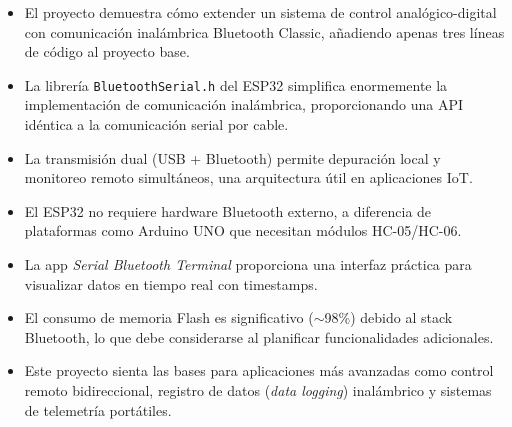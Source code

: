 \documentclass[12pt,a4paper]{article}
\begin{document}
\begin{itemize}
    \item El proyecto demuestra cómo extender un sistema de control analógico-digital con comunicación inalámbrica Bluetooth Classic, añadiendo apenas tres líneas de código al proyecto base.
    \item La librería \texttt{BluetoothSerial.h} del ESP32 simplifica enormemente la implementación de comunicación inalámbrica, proporcionando una API idéntica a la comunicación serial por cable.
    \item La transmisión dual (USB + Bluetooth) permite depuración local y monitoreo remoto simultáneos, una arquitectura útil en aplicaciones IoT.
    \item El ESP32 no requiere hardware Bluetooth externo, a diferencia de plataformas como Arduino UNO que necesitan módulos HC-05/HC-06.
    \item La app \textit{Serial Bluetooth Terminal} proporciona una interfaz práctica para visualizar datos en tiempo real con timestamps.
    \item El consumo de memoria Flash es significativo ($\sim$98\%) debido al stack Bluetooth, lo que debe considerarse al planificar funcionalidades adicionales.
    \item Este proyecto sienta las bases para aplicaciones más avanzadas como control remoto bidireccional, registro de datos (\textit{data logging}) inalámbrico y sistemas de telemetría portátiles.
\end{itemize}
\end{document}
